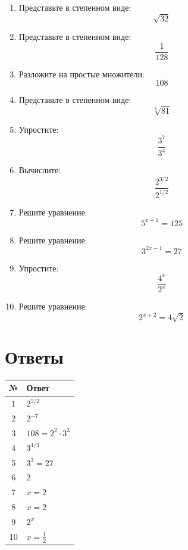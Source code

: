 \documentclass[a4paper,12pt]{article}
\begin{document}
\begin{enumerate}[itemsep=1em]

\item Представьте в степенном виде:
\[
\sqrt{32}
\]

\item Представьте в степенном виде:
\[
\frac1{128}
\]

\item Разложите на простые множители:
\[
108
\]

\item Представьте в степенном виде:
\[
\sqrt[3]{81}
\]

\item Упростите:
\[
\frac{3^7}{3^4}
\]

\item Вычислите:
\[
\frac{2^{3/2}}{2^{1/2}}
\]

\item Решите уравнение:
\[
5^{x+1}=125
\]

\item Решите уравнение:
\[
3^{2x-1}=27
\]

\item Упростите:
\[
\frac{4^{x}}{2^{x}}
\]

\item Решите уравнение:
\[
2^{x+2}=4\sqrt2
\]

\end{enumerate}

\clearpage

\section*{Ответы}

\renewcommand{\arraystretch}{1.3}

\begin{center}
\begin{tabularx}{\linewidth}{cX}
\toprule
№ & Ответ\\
\midrule
1 & $2^{5/2}$\\
2 & $2^{-7}$\\
3 & $108=2^2\cdot3^3$\\
4 & $3^{4/3}$\\
5 & $3^3=27$\\
6 & $2$\\
7 & $x=2$\\
8 & $x=2$\\
9 & $2^x$\\
10 & $x=\frac12$\\
\bottomrule
\end{tabularx}
\end{center}

\clearpage
\end{document}
